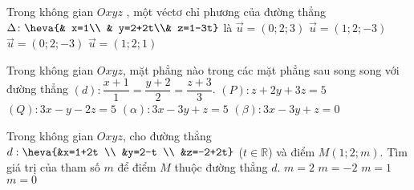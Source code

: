 \begin{ex}%
Trong không gian $Oxyz$ , một véctơ chỉ phương của đường thẳng
$\Delta\colon \heva{& x=1\\ & y=2+2t\\&     z=1-3t}$ là
\choice
{$\vec{u}=\left(0;2;3\right)$}
{$\vec{u}=\left(1;2;-3\right)$}
{\True $\vec{u}=\left(0;2;-3\right)$}
{$\vec{u}=\left(1;2;1\right)$}
\end{ex}

\begin{ex}%
Trong không gian $Oxyz$, mặt phẳng nào trong các mặt phẳng sau song song với đường thẳng
$(d)\colon  \dfrac{x+1}{1}=\dfrac{y+2}{2}=\dfrac{z+3}{3}$.
\choice
{$(P)\colon  z+2 y+3 z=5$}
{$(Q)\colon  3 x-y-2 z=5$}
{\True $(\alpha)\colon  3 x-3 y+z=5$}
{$(\beta)\colon  3 x-3 y+z=0$}
\end{ex}

\begin{ex}%
Trong không gian $Oxyz$, cho đường thẳng $d: \heva{&x=1+2t \\ &y=2-t \\ &z=-2+2t}$ ($t\in\mathbb{R}$) và điểm $M(1;2;m)$. Tìm giá trị của tham số $m$ để điểm $M$ thuộc đường thẳng $d$.
\choice
{$m=2$}
{\True $m=-2$}
{$m=1$}
{$m=0$}
\end{ex}

